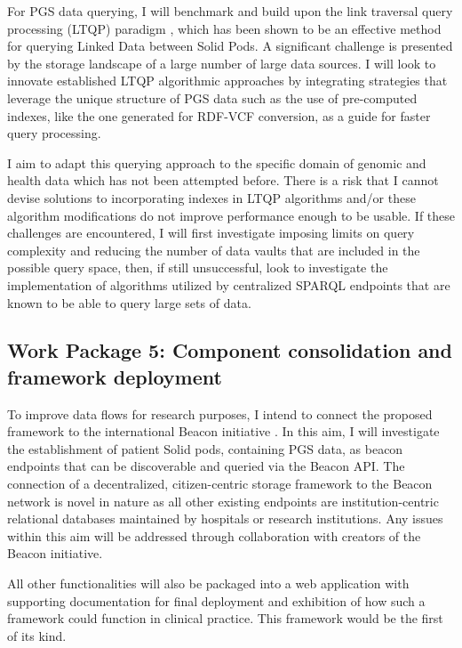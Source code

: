 \documentclass[runningheads]{llncs}
\begin{document}
For PGS data querying, I will benchmark and build upon the link traversal query processing (LTQP) paradigm \cite{taelman_evaluation_2023}, which has been shown to be an effective method for querying Linked Data between Solid Pods. 
A significant challenge is presented by the storage landscape of a large number of large data sources.
I will look to innovate established LTQP algorithmic approaches by integrating strategies that leverage the unique structure of PGS data such as the use of pre-computed indexes, like the one generated for RDF-VCF conversion, as a guide for faster query processing.

I aim to adapt this querying approach to the specific domain of genomic and health data which has not been attempted before. 
There is a risk that I cannot devise solutions to incorporating indexes in LTQP algorithms and/or these algorithm modifications do not improve performance enough to be usable.
If these challenges are encountered, I will first investigate imposing limits on query complexity and reducing the number of data vaults that are included in the possible query space, then, if still unsuccessful, look to investigate the implementation of algorithms utilized by centralized SPARQL endpoints that are known to be able to query large sets of data. 


\subsection{Work Package 5: Component consolidation and framework deployment}

To improve data flows for research purposes, I intend to connect the proposed framework to the international Beacon initiative \cite{rambla_beacon_2022}. 
In this aim, I will investigate the establishment of patient Solid pods, containing PGS data, as beacon endpoints that can be discoverable and queried via the Beacon API. 
The connection of a decentralized, citizen-centric storage framework to the Beacon network is novel in nature as all other existing endpoints are institution-centric relational databases maintained by hospitals or research institutions.
Any issues within this aim will be addressed through collaboration with creators of the Beacon initiative.

All other functionalities will also be packaged into a web application with supporting documentation for final deployment and exhibition of how such a framework could function in clinical practice.
This framework would be the first of its kind.
\end{document}
